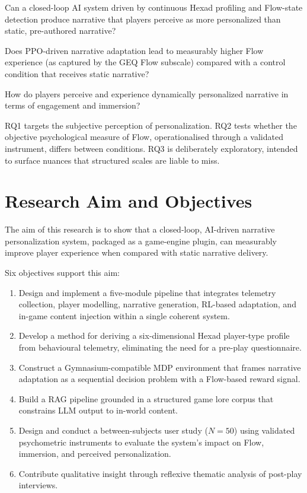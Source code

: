 \begin{description}[leftmargin=1cm]
\item[RQ1:] Can a closed-loop AI system driven by continuous Hexad profiling and Flow-state detection produce narrative that players perceive as more personalized than static, pre-authored narrative?

\item[RQ2:] Does PPO-driven narrative adaptation lead to measurably higher Flow experience (as captured by the GEQ Flow subscale) compared with a control condition that receives static narrative?

\item[RQ3:] How do players perceive and experience dynamically personalized narrative in terms of engagement and immersion?
\end{description}

RQ1 targets the subjective perception of personalization. RQ2 tests whether the objective psychological measure of Flow, operationalised through a validated instrument, differs between conditions. RQ3 is deliberately exploratory, intended to surface nuances that structured scales are liable to miss.

\section{Research Aim and Objectives}

The aim of this research is to show that a closed-loop, AI-driven narrative personalization system, packaged as a game-engine plugin, can measurably improve player experience when compared with static narrative delivery.

Six objectives support this aim:

\begin{enumerate}
\item Design and implement a five-module pipeline that integrates telemetry collection, player modelling, narrative generation, RL-based adaptation, and in-game content injection within a single coherent system.
\item Develop a method for deriving a six-dimensional Hexad player-type profile from behavioural telemetry, eliminating the need for a pre-play questionnaire.
\item Construct a Gymnasium-compatible MDP environment that frames narrative adaptation as a sequential decision problem with a Flow-based reward signal.
\item Build a RAG pipeline grounded in a structured game lore corpus that constrains LLM output to in-world content.
\item Design and conduct a between-subjects user study ($N = 50$) using validated psychometric instruments to evaluate the system's impact on Flow, immersion, and perceived personalization.
\item Contribute qualitative insight through reflexive thematic analysis of post-play interviews.
\end{enumerate}

